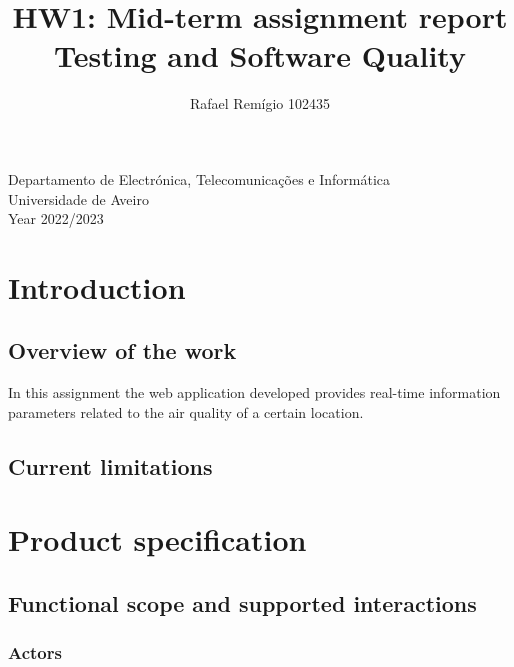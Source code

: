 \documentclass[12pt]{article}
\begin{document}
\begin{titlepage}

\title{%
  HW1: Mid-term assignment report\\
  \large  Testing and Software Quality\\}

\author{Rafael Remígio 102435}

\maketitle

\vfill
\begin{center}

	Departamento de Electrónica, Telecomunicações e Informática\\
       Universidade de Aveiro\\ Year 2022/2023
\end{center}



\end{titlepage}

\tableofcontents


\section{Introduction}

\subsection{Overview of the work} 

In this assignment the web application developed provides real-time information parameters related to the air quality of a certain location.

\subsection{Current limitations} 


\section{Product specification}


\subsection{Functional scope and supported interactions }


\subsubsection{Actors}
\end{document}
